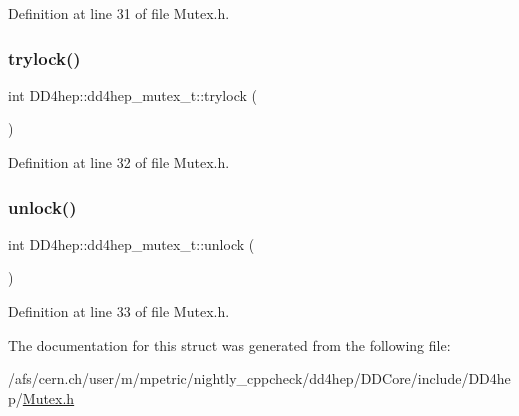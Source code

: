 Definition at line 31 of file Mutex.\+h.

\hypertarget{struct_d_d4hep_1_1dd4hep__mutex__t_a71b8088c0188d51c0433eda5556e4189}{}\label{struct_d_d4hep_1_1dd4hep__mutex__t_a71b8088c0188d51c0433eda5556e4189} 
\subsubsection{\texorpdfstring{trylock()}{trylock()}}
{\footnotesize\ttfamily int D\+D4hep\+::dd4hep\+\_\+mutex\+\_\+t\+::trylock (\begin{DoxyParamCaption}{ }\end{DoxyParamCaption})\hspace{0.3cm}{\ttfamily [inline]}}



Definition at line 32 of file Mutex.\+h.

\hypertarget{struct_d_d4hep_1_1dd4hep__mutex__t_af41a64ce1a44de41262fb127d4737d34}{}\label{struct_d_d4hep_1_1dd4hep__mutex__t_af41a64ce1a44de41262fb127d4737d34} 
\subsubsection{\texorpdfstring{unlock()}{unlock()}}
{\footnotesize\ttfamily int D\+D4hep\+::dd4hep\+\_\+mutex\+\_\+t\+::unlock (\begin{DoxyParamCaption}{ }\end{DoxyParamCaption})\hspace{0.3cm}{\ttfamily [inline]}}



Definition at line 33 of file Mutex.\+h.



The documentation for this struct was generated from the following file\+:\begin{DoxyCompactItemize}
\item 
/afs/cern.\+ch/user/m/mpetric/nightly\+\_\+cppcheck/dd4hep/\+D\+D\+Core/include/\+D\+D4hep/\hyperlink{_mutex_8h}{Mutex.\+h}\end{DoxyCompactItemize}
